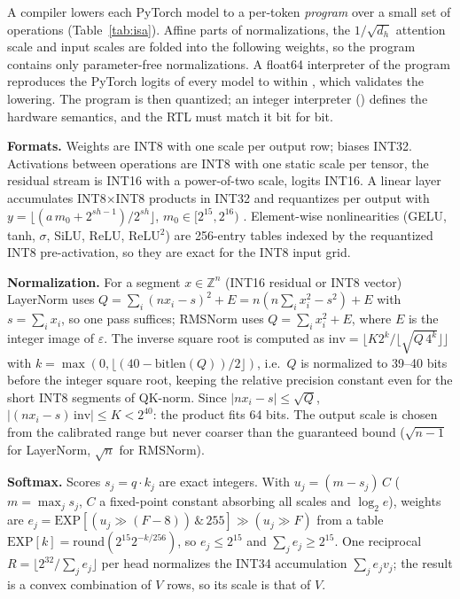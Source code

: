 A compiler lowers each PyTorch model to a per-token \emph{program} over a small set of operations (Table~\ref{tab:isa}).
Affine parts of normalizations, the $1/\sqrt{d_h}$ attention scale and input scales are folded into the following
weights, so the program contains only parameter-free normalizations. A float64 interpreter of the program reproduces the
PyTorch logits of every model to within \zooIrErr{}, which validates the lowering. The program is then quantized; an
integer interpreter () defines the hardware semantics, and the RTL must match it bit for bit.

\textbf{Formats.} Weights are INT8 with one scale per output row; biases INT32. Activations between operations are INT8
with one static scale per tensor, the residual stream is INT16 with a power-of-two scale, logits INT16. A linear layer
accumulates INT8$\times$INT8 products in INT32 and requantizes per output with $y=\lfloor(a\,m_0+2^{sh-1})/2^{sh}\rfloor$,
$m_0\in[2^{15},2^{16})$ \cite{jacob2018integer}. Element-wise nonlinearities (GELU, tanh, $\sigma$, SiLU, ReLU, ReLU$^2$)
are 256-entry tables indexed by the requantized INT8 pre-activation, so they are exact for the INT8 input grid.

\textbf{Normalization.} For a segment $x\in\mathbb{Z}^n$ (INT16 residual or INT8 vector) LayerNorm uses
$Q = \sum_i (n x_i - s)^2 + E = n(n\sum_i x_i^2 - s^2) + E$ with $s=\sum_i x_i$, so one pass suffices; RMSNorm uses
$Q=\sum_i x_i^2+E$, where $E$ is the integer image of $\varepsilon$. The inverse square root is computed as
$\mathrm{inv}=\lfloor K 2^k/\lfloor\sqrt{Q\,4^k}\rfloor\rfloor$ with $k=\max(0,\lfloor(40-\mathrm{bitlen}(Q))/2\rfloor)$,
i.e.\ $Q$ is normalized to 39--40 bits before the integer square root, keeping the relative precision constant even for
the short INT8 segments of QK-norm. Since $|nx_i-s|\le\sqrt{Q}$, $|(nx_i-s)\,\mathrm{inv}|\le K < 2^{40}$: the product
fits 64 bits. The output scale is chosen from the calibrated range but never coarser than the guaranteed bound
($\sqrt{n-1}$ for LayerNorm, $\sqrt n$ for RMSNorm).

\textbf{Softmax.} Scores $s_j=q\cdot k_j$ are exact integers. With $u_j=(m-s_j)\,C$ ($m=\max_j s_j$, $C$ a fixed-point
constant absorbing all scales and $\log_2 e$), weights are $e_j=\mathrm{EXP}[(u_j \gg (F-8))\,\&\,255]\gg(u_j\gg F)$ from
a table $\mathrm{EXP}[k]=\mathrm{round}(2^{15}2^{-k/256})$, so $e_j\le 2^{15}$ and $\sum_j e_j\ge 2^{15}$. One reciprocal
$R=\lfloor 2^{32}/\sum_j e_j\rfloor$ per head normalizes the INT34 accumulation $\sum_j e_j v_j$; the result is a convex
combination of $V$ rows, so its scale is that of $V$.

